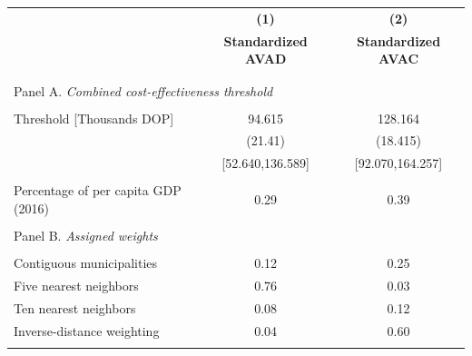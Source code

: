 \begin{tabular}{l c c}
\toprule[1.5pt]
\multicolumn{1}{c}{\textbf{}} & \textbf{(1)} & \textbf{(2)}  \\
\multicolumn{1}{c}{\textbf{}} &  \textbf{Standardized AVAD} & \textbf{Standardized AVAC}  \\ \hline \\
\\
\multicolumn{3}{l}{Panel A. \textit{Combined cost-effectiveness threshold}}\\
\\
Threshold [Thousands DOP] & 94.615  & 128.164  \\
& (21.41) & (18.415) \\
& [52.640,136.589]  & [92.070,164.257]    \\
\\
Percentage of per capita GDP (2016) &  0.29 &   0.39 \\
\\
\multicolumn{3}{l}{Panel B. \textit{Assigned weights}} \\
\\
Contiguous municipalities &  0.12  &  0.25 \\
Five nearest neighbors &  0.76 &  0.03 \\
Ten nearest neighbors &  0.08 &  0.12 \\
Inverse-distance weighting &  0.04 &  0.60 \\
\\
\bottomrule[1 pt]
\end{tabular}
